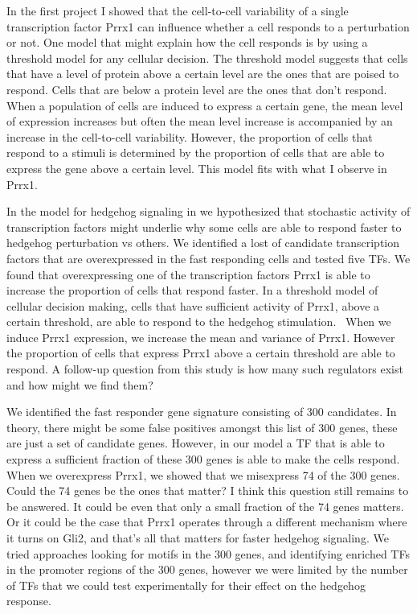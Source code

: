 In the first project I showed that the cell-to-cell variability of a single transcription factor Prrx1 can influence whether a cell responds to a perturbation or not. One model that might explain how the cell responds is by using a threshold model for any cellular decision. The threshold model suggests that cells that have a level of protein above a certain level are the ones that are poised to respond. Cells that are below a protein level are the ones that don't respond. When a population of cells are induced to express a certain gene, the mean level of expression increases but often the mean level increase is accompanied by an increase in the cell-to-cell variability. However, the proportion of cells that respond to a stimuli is determined by the proportion of cells that are able to express the gene above a certain level. This model fits with what I observe in Prrx1.

In the model for hedgehog signaling in \label{Chap:hedgehog} we hypothesized that stochastic activity of transcription factors might underlie why some cells are able to respond faster to hedgehog perturbation vs others. We identified a lost of candidate transcription factors that are overexpressed in the fast responding cells and tested five TFs. We found that overexpressing one of the transcription factors Prrx1 is able to increase the proportion of cells that respond faster. In a threshold model of cellular decision making, cells that have sufficient activity of Prrx1, above a certain threshold, are able to respond to the hedgehog stimulation.  When we induce Prrx1 expression, we increase the mean and variance of Prrx1. However the proportion of cells that express Prrx1 above a certain threshold are able to respond. A follow-up question from this study is how many such regulators exist and how might we find them?

We identified the fast responder gene signature consisting of 300 candidates. In theory, there might be some false positives amongst this list of 300 genes, these are just a set of candidate genes. However, in our model a TF that is able to express a sufficient fraction of these 300 genes is able to make the cells respond. When we overexpress Prrx1, we showed that we misexpress 74 of the 300 genes. Could the 74 genes be the ones that matter? I think this question still remains to be answered. It could be even that only a small fraction of the 74 genes matters. Or it could be the case that Prrx1 operates through a different mechanism where it turns on Gli2, and that's all that matters for faster hedgehog signaling. We tried approaches looking for motifs in the 300 genes, and identifying enriched TFs in the promoter regions of the 300 genes, however we were limited by the number of TFs that we could test experimentally for their effect on the hedgehog response. 

